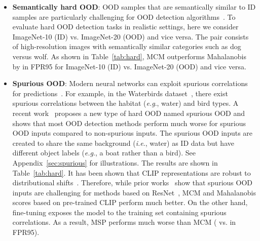 \documentclass{article}
\def\ie{\emph{i.e}., }
\def\eg{\emph{e.g}., }
\begin{document}
\begin{itemize}[leftmargin=*,topsep=4pt,itemsep=4pt,parsep=0pt]
    \item \textbf{Semantically hard OOD}: OOD samples that are semantically similar to ID samples are particularly challenging for OOD detection algorithms~\cite{winkens2020contrastive}. To evaluate hard OOD detection tasks in realistic settings, here we consider ImageNet-10 (ID) vs. ImageNet-20 (OOD) and vice versa. The pair consists of high-resolution images with semantically similar categories such as dog versus wolf. As shown in Table~\ref{tab:hard}, MCM outperforms Mahalanobis~\cite{lee2018simple} by  in FPR95 for ImageNet-10 (ID) vs. ImageNet-20 (OOD) and  vice versa.  
    \item \textbf{Spurious OOD}: Modern neural networks can exploit spurious correlations for predictions~\cite{beery2018recognition}. For example, in the Waterbirds dataset~\cite{sagawa2019distributionally}, there exist spurious correlations between the habitat (\eg water) and bird types. A recent work~\cite{ming2022spurious} proposes a new type of hard OOD named spurious OOD and shows that most OOD detection methods perform much worse for spurious OOD inputs compared to non-spurious inputs.  The spurious OOD inputs are created to share the same background (\ie water) as ID data but have different object labels (\eg a boat rather than a bird). See Appendix~\ref{sec:spurious} for illustrations. The results are shown in Table~\ref{tab:hard}. It has been shown that CLIP representations are robust to distributional shifts~\cite{radford2021learning}. Therefore, while prior works~\cite{ming2022spurious} show that spurious OOD inputs are challenging for methods based on ResNet~\cite{he2016deep}, MCM and Mahalanobis scores based on pre-trained CLIP perform much better. On the other hand, fine-tuning exposes the model to the training set containing spurious correlations. As a result, MSP performs much worse than MCM ( vs.  in FPR95).

\end{itemize}
\end{document}
